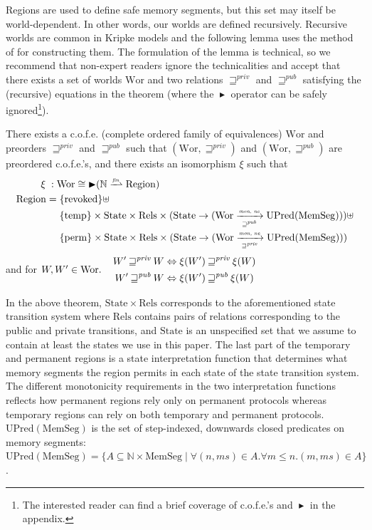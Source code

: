 \documentclass[format=acmsmall, review=true, screen=true]{acmart}
\newcommand{\finparfun}{\xrightharpoonup{\textit{\tiny{fin}}}}
\newcommand{\fun}{\rightarrow}
\newcommand{\blater}{\mathop{\blacktriangleright}}
\newcommand{\cofe}{c.o.f.e.}
\newcommand{\cofes}{\cofe{}'s}
\newcommand\lau[1]{{\color{purple} \sf \footnotesize {LS: #1}}\\}
\newcommand\dominique[1]{{\color{purple} \sf \footnotesize {DD: #1}}\\}
\renewcommand\lau[1]{}
\renewcommand\dominique[1]{}
\newcommand{\var}[1]{\mathit{#1}}
\newcommand{\futurewk}{\mathbin{\sqsupseteq}^{\var{pub}}}
\newcommand{\futurestr}{\mathbin{\sqsupseteq}^{\var{priv}}}
\newcommand{\monwknefun}{\xrightarrow[\text{\tiny{$\futurewk$}}]{\textit{\tiny{mon, ne}}}}
\newcommand{\monstrnefun}{\xrightarrow[\text{\tiny{$\futurestr$}}]{\textit{\tiny{mon, ne}}}}
\newcommand{\plaindom}[1]{\mathrm{#1}}
\newcommand{\HeapSegments}{\plaindom{MemSeg}}
\newcommand{\nats}{\mathbb{N}}
\newcommand{\Rels}{\plaindom{Rels}}
\newcommand{\States}{\plaindom{State}}
\newcommand{\Regions}{\plaindom{Region}}
\newcommand{\Wor}{\plaindom{Wor}}
\newcommand{\UPred}[1]{\plaindom{UPred}(#1)}
\newcommand{\plainview}[1]{\mathrm{#1}}
\newcommand{\perma}{\plainview{perm}}
\newcommand{\temp}{\plainview{temp}}
\newcommand{\revoked}{\plainview{revoked}}
\begin{document}
Regions are used to define safe memory segments, but this set may itself be world-dependent. In other
words, our worlds are defined recursively. Recursive worlds are common
in Kripke models and the following lemma uses the method of
\citet{Birkedal:2011:SKM:1926385.1926401,Birkedal:tutorial-notes} for
constructing them. The formulation of the lemma is technical, so we recommend
that non-expert readers ignore the technicalities and accept that there exists a
set of worlds $\Wor$ and two relations $\futurestr$ and $\futurewk$ satisfying
the (recursive) equations in the theorem (where the $\blater$ operator can be
safely ignored\footnote{The interested reader can find a brief coverage of \cofe{}'s
and $\blater$ in the appendix.}).
\begin{theorem}\label{thm:world-existence}
  There exists a \cofe{} (complete ordered family of equivalences) $\Wor$ and preorders $\futurestr$ and
  $\futurewk$ such that $(\Wor,\futurestr)$ and $(\Wor,\futurewk)$ are
  preordered \cofes{}, and there exists an isomorphism $\xi$ such that
  \begin{align*}
      \xi \; : \; & \Wor \cong \blater (\nats \finparfun \Regions)\\
      \Regions  = & \; \{\revoked\} \uplus \\
               & \; \{\temp\} \times \States \times \Rels \times (\States \fun (\Wor \monwknefun \UPred{\HeapSegments}))\uplus \\
               & \; \{\perma\} \times \States \times \Rels \times (\States \fun (\Wor \monstrnefun \UPred{\HeapSegments}))
    \end{align*}
  and for $W, W' \in \Wor\ldotp \quad  
  \begin{aligned}
    W' \futurestr W & \Leftrightarrow \xi(W') \futurestr \xi(W)   \\
    W' \futurewk W & \Leftrightarrow \xi(W') \futurewk \xi(W)
  \end{aligned}$
\end{theorem}
In the above theorem, $\States \times \Rels$ corresponds to the aforementioned
state transition system where $\Rels$ contains pairs of relations corresponding
to the public and private transitions, and $\States$ is an unspecified set that
we assume to contain at least the states we use in this paper. The last part of
the temporary and permanent regions is a state interpretation function that
determines what memory segments the region permits in each state of the state
transition system.  The different monotonicity requirements in the two
interpretation functions reflects how permanent regions rely only on permanent
protocols whereas temporary regions can rely on both temporary and permanent
protocols.  $\UPred{\HeapSegments}$ is the set of step-indexed, downwards closed
predicates on memory segments:
$\UPred{\HeapSegments} = \{ A \subseteq  \nats \times
\HeapSegments \mid 
\forall (n, ms) \in A. \forall m
\leq n. (m, ms) \in A\}$. 
\
\end{document}
